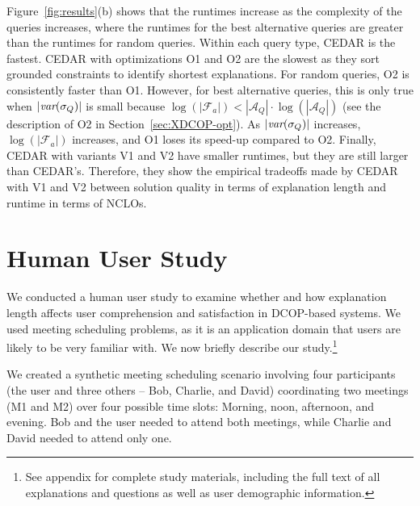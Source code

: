 \documentclass[twoside,11pt]{article}
\begin{document}
Figure~\ref{fig:results}(b) shows that the runtimes increase as the complexity of the queries increases, where the runtimes for the best alternative queries are greater than the runtimes for random queries. Within each query type, CEDAR is the fastest. CEDAR with optimizations O1 and O2 are the slowest as they sort grounded constraints to identify shortest explanations. For random queries, O2 is consistently faster than O1. However, for best alternative queries, this is only true when $|{\textit{var}(\sigma_Q)}|$ is small because $\log(|\mathcal{F}_a|) < |\mathcal{A}_Q| \cdot \log(|\mathcal{A}_Q|)$ (see the description of O2 in Section~\ref{sec:XDCOP-opt}). As $|{\textit{var}(\sigma_Q)}|$ increases, $\log(|\mathcal{F}_a|)$ increases, and O1 loses its speed-up compared to O2. Finally, CEDAR with variants V1 and V2 have smaller runtimes, but they are still larger than CEDAR's. Therefore, they show the empirical tradeoffs made by CEDAR with V1 and V2 between solution quality in terms of explanation length and runtime in terms of NCLOs. 








\section{Human User Study}
\label{sec:user-study}

We conducted a human user study to examine whether and how explanation length affects user comprehension and satisfaction in DCOP-based systems. We used meeting scheduling problems, as it is an application domain that users are likely to be very familiar with.
We now briefly describe our study.\footnote{See appendix for complete study materials, including the full text of all explanations and questions as well as user demographic information.}

 We created a synthetic meeting scheduling scenario involving four participants (the user and three others -- Bob, Charlie, and David) coordinating two meetings (M1 and M2) over four possible time slots: Morning, noon, afternoon, and evening. Bob and the user needed to attend both meetings, while Charlie and David needed to attend only one.
\end{document}
